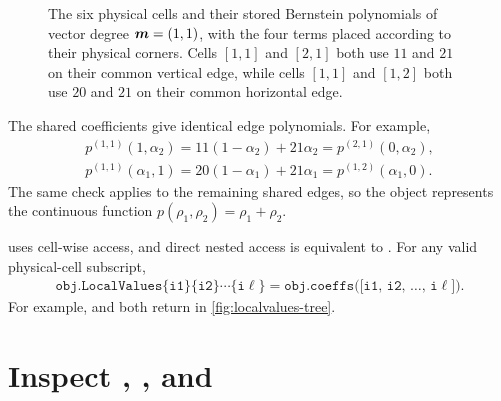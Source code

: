 \begin{figure}[H]
    \caption{The six physical cells and their stored Bernstein polynomials of vector degree $\boldsymbol{m}=(1,1)$, with the four terms placed according to their physical corners. Cells $[1,1]$ and $[2,1]$ both use $11$ and $21$ on their common vertical edge, while cells $[1,1]$ and $[1,2]$ both use $20$ and $21$ on their common horizontal edge.}
    \label{fig:localvalues-physical-grid}
\end{figure}

The shared coefficients give identical edge polynomials. For example,
\begin{gather*}
    p^{(1,1)}(1,\alpha_2)=11(1-\alpha_2)+21\alpha_2=p^{(2,1)}(0,\alpha_2),\\
    p^{(1,1)}(\alpha_1,1)=20(1-\alpha_1)+21\alpha_1=p^{(1,2)}(\alpha_1,0).
\end{gather*}
The same check applies to the remaining shared edges, so the object represents the continuous function $p(\rho_1,\rho_2)=\rho_1+\rho_2$.

 uses cell-wise access, and direct nested access is equivalent to . For any valid physical-cell subscript,
\begin{gather*}
    \texttt{obj.LocalValues\{i1\}\{i2\}}\cdots\texttt{\{i}{\ell}\texttt{\}}
    =\texttt{obj.coeffs([i1, i2, }\ldots\texttt{, i}{\ell}\texttt{])}.
\end{gather*}
For example,  and  both return  in \cref{fig:localvalues-tree}.

\section{Inspect \texorpdfstring{}{cells}, \texorpdfstring{}{lbls}, and \texorpdfstring{}{coeffs}}
\label{sec:pdbase-inspection}

